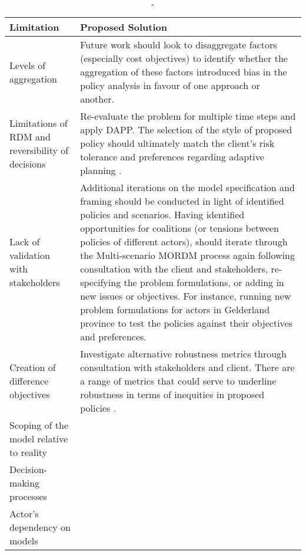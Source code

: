 \begin{table}[h]
\caption{-}
\label{tab:Proposed Solutions}
\centering
\begin{tabular}{p{}|p{}}
\textbf{Limitation} & \textbf{Proposed Solution}  \\ \hline
Levels of aggregation & Future work should look to disaggregate factors (especially cost objectives) to identify whether the aggregation of these factors introduced bias in the policy analysis in favour of one approach or another. \\ \hline
Limitations of RDM and reversibility of decisions & Re-evaluate the problem for multiple time steps and apply DAPP. The selection of the style of proposed policy should ultimately match the client's risk tolerance and preferences regarding adaptive planning \parencite{marchau_decision_2019}. \\ \hline
Lack of validation with stakeholders &Additional iterations on the model specification and framing should be conducted in light of identified policies and scenarios. Having identified opportunities for coalitions (or tensions between policies of different actors), should iterate through the Multi-scenario MORDM process again following consultation with the client and stakeholders, re-specifying the problem formulations, or adding in new issues or objectives. For instance, running new problem formulations for actors in Gelderland province to test the policies against their objectives and preferences. \\ \hline
Creation of difference objectives & Investigate alternative robustness metrics through consultation with stakeholders and client. There are a range of metrics that could serve to underline robustness in terms of inequities in proposed policies \parencite{mcphail_robustness_2018}. \\ \hline
Scoping of the model relative to reality &                    \\ \hline
Decision-making processes &                    \\ \hline
Actor's dependency on models &                   
\end{tabular}
\end{table}

